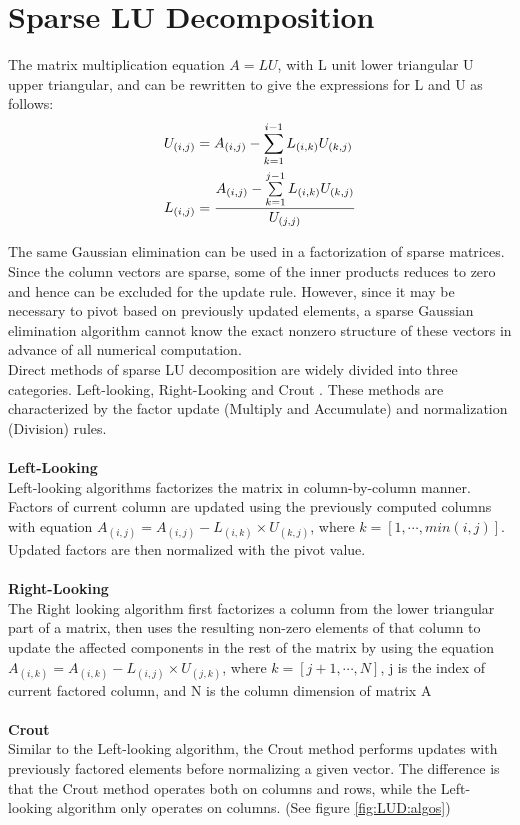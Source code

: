 \section{Sparse LU Decomposition}

The matrix multiplication equation \(A = LU\), with L unit lower triangular U upper
triangular, and  can be rewritten to give the expressions for L and U as follows:
\begin{subequations}
    \centering
    \begin{align}
        U_{(i,j)} & = A_{(i,j)} - \sum\limits_{k = 1}^{i-1} L_{(i,k)}U_{(k,j)} \\
        L_{(i,j)} & = \frac{A_{(i,j)} - \sum\limits_{k = 1}^{j-1} L_{(i,k)}U_{(k,j)}}{U_{(j,j)}}
    \end{align}
    \label{eqn:LUD:LUequation}
\end{subequations}

The same Gaussian elimination can be used in a factorization of sparse matrices.
Since the column vectors are sparse, some of the inner products reduces to zero and hence
can be excluded for the update rule. However, since it may be
necessary to pivot based on previously updated elements, a sparse Gaussian elimination
algorithm cannot know the exact nonzero structure of these vectors in advance of all
numerical computation. \\
Direct methods of sparse LU decomposition are widely divided into three categories.
Left-looking, Right-Looking and Crout \cite{crout}. These methods are characterized
by the factor update (Multiply and Accumulate) and normalization (Division) rules.
\\
\\
\textbf{Left-Looking}
\\
Left-looking algorithms factorizes the matrix in column-by-column manner. Factors
of current column are updated using the previously computed columns with
equation \(A_{(i,j)} = A_{(i,j)} - L_{(i,k)} \times U_{(k,j)} \), where 
\(k = [1, \cdots, min(i,j)]\). Updated factors are then normalized with the pivot value.
\\
\\
\textbf{Right-Looking} 
\\
The Right looking algorithm first factorizes a column from the lower triangular part 
of a matrix, then uses the resulting non-zero elements of that column to update 
the affected components in the rest of the matrix by using the equation
\(A_{(i,k)} = A_{(i,k)} - L_{(i,j)} \times U_{(j,k)} \), where \(k = [j+1, \cdots, N]\),
j is the index of current factored column, and N is the column dimension of matrix A
\\
\\
\textbf{Crout}
\\
Similar to the Left-looking algorithm, the Crout method performs updates with 
previously factored elements before normalizing a given vector. The difference 
is that the Crout method operates both on columns and rows, while the Left-looking
algorithm only operates on columns. (See figure \ref{fig:LUD:algos})

